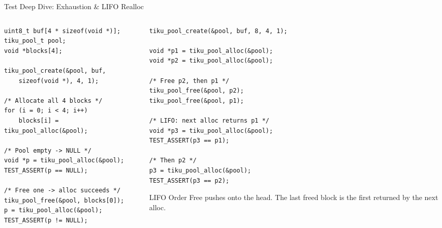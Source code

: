 \documentclass[aspectratio=169, 10pt]{beamer}
\begin{document}
\begin{frame}[fragile]{Test Deep Dive: Exhaustion \& LIFO Realloc}
\begin{columns}[T]
\begin{column}{0.48\textwidth}
\begin{lstlisting}[style=cstyle, title={Pool exhaustion test}]
uint8_t buf[4 * sizeof(void *)];
tiku_pool_t pool;
void *blocks[4];

tiku_pool_create(&pool, buf,
    sizeof(void *), 4, 1);

/* Allocate all 4 blocks */
for (i = 0; i < 4; i++)
    blocks[i] = tiku_pool_alloc(&pool);

/* Pool empty -> NULL */
void *p = tiku_pool_alloc(&pool);
TEST_ASSERT(p == NULL);

/* Free one -> alloc succeeds */
tiku_pool_free(&pool, blocks[0]);
p = tiku_pool_alloc(&pool);
TEST_ASSERT(p != NULL);
\end{lstlisting}
\end{column}

\begin{column}{0.48\textwidth}
\begin{lstlisting}[style=cstyle, title={LIFO freelist test}]
tiku_pool_create(&pool, buf, 8, 4, 1);

void *p1 = tiku_pool_alloc(&pool);
void *p2 = tiku_pool_alloc(&pool);

/* Free p2, then p1 */
tiku_pool_free(&pool, p2);
tiku_pool_free(&pool, p1);

/* LIFO: next alloc returns p1 */
void *p3 = tiku_pool_alloc(&pool);
TEST_ASSERT(p3 == p1);

/* Then p2 */
p3 = tiku_pool_alloc(&pool);
TEST_ASSERT(p3 == p2);
\end{lstlisting}

\vspace{0.3em}
\begin{block}{LIFO Order}
Free pushes onto the head. The last freed block
is the first returned by the next alloc.
\end{block}
\end{column}
\end{columns}
\end{frame}
\end{document}
